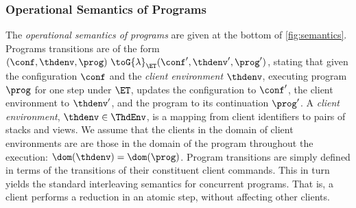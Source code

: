 \subsubsection{Operational Semantics of Programs}

The \emph{operational semantics of programs} are given at the bottom of \cref{fig:semantics}. 
Programs transitions are of the form $(\conf,  \thdenv, \prog) \ \toG{\lambda}_{\ET} (\conf',  \thdenv', \prog')$,
stating that given the configuration $\conf$ and the \emph{client environment} $\thdenv$, executing program $\prog$ for one step under $\ET$, updates the configuration to $\conf'$, the client environment to $\thdenv'$, and the program to its continuation $\prog'$. 
A \emph{client environment}, $\thdenv \in \ThdEnv$, is a mapping from client identifiers to pairs of stacks and views. 
We assume that the clients in the domain of client environments are are those in the domain of the program throughout the execution: 
$\dom(\thdenv) = \dom(\prog)$.
Program transitions are simply defined in terms of the transitions of their constituent client commands.
This in turn yields the standard interleaving semantics for concurrent programs. 
That is, a client performs a reduction in an atomic step, without affecting other clients.

